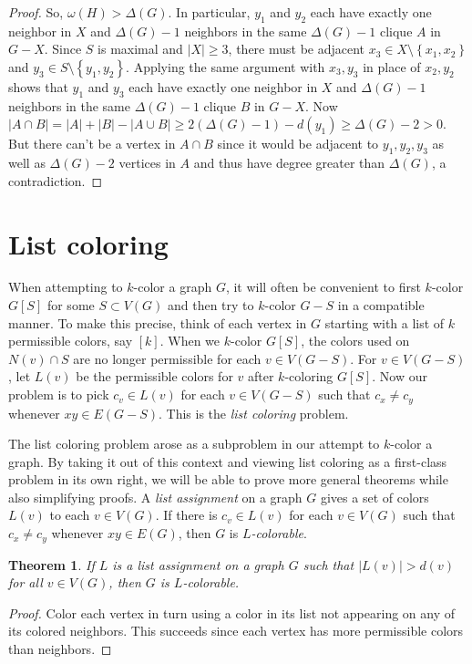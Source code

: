 \documentclass[openany]{tufte-book} %
\theoremstyle{plain}
\newtheorem{theorem}{Theorem}
\newcommand{\set}[1]{\left\{ #1 \right\}}
\newcommand{\card}[1]{\left|#1\right|}
\newcommand{\irange}[1]{\left[#1\right]}
\begin{document}
\begin{proof}
So, $\omega(H) > \Delta(G)$.  In particular, $y_1$ and $y_2$ each have exactly one neighbor in $X$ and $\Delta(G) - 1$ neighbors in the same $\Delta(G) -1$ clique $A$ in $G - X$.
 Since $S$ is maximal and $\card{X} \ge 3$, there must be adjacent
$x_3 \in X \setminus \set{x_1,x_2}$ and $y_3 \in S \setminus \set{y_1,y_2}$.  Applying the same argument with $x_3, y_3$ in place of $x_2, y_2$ shows
that $y_1$ and $y_3$ each have exactly one neighbor in $X$ and $\Delta(G) - 1$ neighbors in the same $\Delta(G) -1$ clique $B$ in $G - X$.
Now $\card{A\cap B} = \card{A} + \card{B} - \card{A\cup B} \ge 2(\Delta(G) - 1) - d(y_1) \ge \Delta(G) - 2 > 0$.  But there can't be a vertex
in $A \cap B$ since it would be adjacent to $y_1,y_2,y_3$ as well as $\Delta(G) - 2$ vertices in $A$ and thus have degree greater than $\Delta(G)$, a contradiction. 
\end{proof}

\section{List coloring}
When attempting to $k$-color a graph $G$, it will often be convenient to first $k$-color $G[S]$ for some $S \subset V(G)$ and then try to 
$k$-color $G-S$ in a compatible manner. To make this precise, think of each vertex in $G$ starting with a list of $k$ permissible colors, say $\irange{k}$.
When we $k$-color $G[S]$, the colors used on $N(v) \cap S$ are no longer permissible for each $v \in V(G-S)$.  For $v \in V(G-S)$, let $L(v)$ be the permissible colors
for $v$ after $k$-coloring $G[S]$.  Now our problem is to pick $c_v \in L(v)$ for each $v \in V(G-S)$ such that $c_x \ne c_y$ whenever $xy \in E(G-S)$.  This is the
\emph{list coloring} problem.

The list coloring problem arose as a subproblem in our attempt to $k$-color a graph.  By taking it out of this context and viewing list coloring as a first-class problem in its own
right, we will be able to prove more general theorems while also simplifying proofs.  A \emph{list assignment} on a graph $G$ gives a set of colors $L(v)$ to each $v \in V(G)$.  
If there is $c_v \in L(v)$ for each $v \in V(G)$ such that $c_x \ne c_y$ whenever $xy \in E(G)$, then $G$ is \emph{$L$-colorable}.

\begin{theorem}\label{FirstListBound}
If $L$ is a list assignment on a graph $G$ such that $\card{L(v)} > d(v)$ for all $v \in V(G)$, then $G$ is $L$-colorable.
\end{theorem}
\begin{proof}
Color each vertex in turn using a color in its list not appearing on any of its colored neighbors.  
This succeeds since each vertex has more permissible colors than neighbors.
\end{proof}
\end{document}
